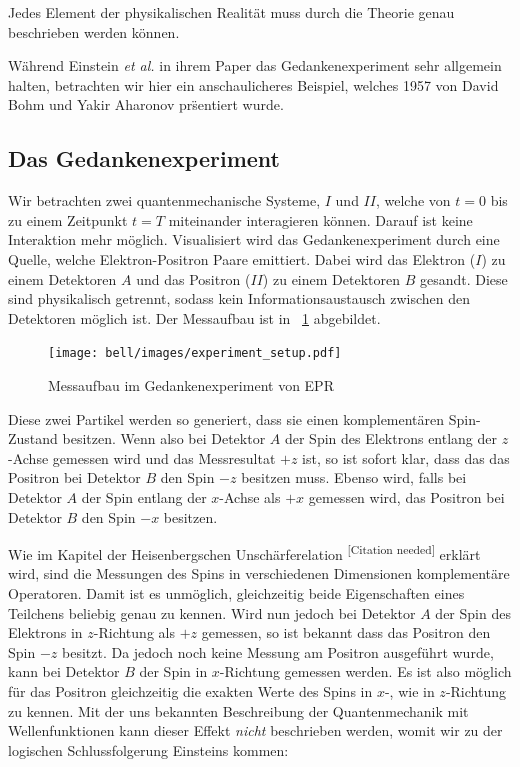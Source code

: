 \begin{refsection}
\begin{definition}\label{def:Bell:Vollstaendigkeit}
    Jedes Element der physikalischen Realit\"at muss durch die Theorie
    genau beschrieben werden k\"onnen.
\end{definition}

Während Einstein \emph{et al.} in ihrem Paper das Gedankenexperiment sehr
allgemein halten, betrachten wir hier ein anschaulicheres Beispiel, welches
1957 von David Bohm und Yakir Aharonov \cite{Bell:Bohm1957} pr\"sentiert wurde.

\subsection{Das Gedankenexperiment}
Wir betrachten zwei quantenmechanische Systeme, $I$ und $II$,
welche von $t=0$ bis zu einem Zeitpunkt $t=T$ miteinander 
interagieren k\"onnen. Darauf ist keine Interaktion mehr m\"oglich.
Visualisiert wird das Gedankenexperiment durch eine Quelle, welche
Elektron-Positron Paare emittiert. 
Dabei wird das Elektron ($I$) zu einem Detektoren $A$ und das 
Positron ($II$) zu einem Detektoren $B$ gesandt.
Diese sind physikalisch getrennt, sodass kein Informationsaustausch
zwischen den Detektoren m\"oglich ist.
Der Messaufbau ist in \figurename~\ref{fig:bell:EPR_Messaufbau} abgebildet.

\begin{figure}
    \centering
    \texttt{[image: bell/images/experiment\_setup.pdf]}
    \caption{Messaufbau im Gedankenexperiment von EPR}
    \label{fig:bell:EPR_Messaufbau}
\end{figure}

Diese zwei Partikel werden so generiert, dass sie einen komplement\"aren
Spin-Zustand besitzen. 
Wenn also bei Detektor $A$ der Spin des Elektrons entlang der $z$-Achse
gemessen wird und das Messresultat $+z$ ist, so ist sofort klar, dass
das das Positron bei Detektor $B$ den Spin $-z$ besitzen muss. 
Ebenso wird, falls bei Detektor $A$ der Spin entlang der $x$-Achse als $+x$
gemessen wird, das Positron bei Detektor $B$ den Spin $-x$ besitzen.

Wie im Kapitel der Heisenbergschen Unsch\"arferelation
\textsuperscript{[Citation needed]}
erkl\"art wird, sind die Messungen des Spins in verschiedenen Dimensionen 
komplement\"are Operatoren.
Damit ist es unm\"oglich, gleichzeitig beide Eigenschaften eines Teilchens
beliebig genau zu kennen.
Wird nun jedoch bei Detektor $A$ der Spin des Elektrons in $z$-Richtung 
als $+z$ gemessen, so ist bekannt dass das Positron den Spin $-z$ besitzt.
Da jedoch noch keine Messung am Positron ausgef\"uhrt wurde, kann bei
Detektor $B$ der Spin in $x$-Richtung gemessen werden.
Es ist also m\"oglich f\"ur das Positron gleichzeitig die exakten Werte 
des Spins in $x$-, wie in $z$-Richtung zu kennen. 
Mit der uns bekannten Beschreibung der Quantenmechanik mit Wellenfunktionen
kann dieser Effekt \emph{nicht} beschrieben werden, womit wir zu der
logischen Schlussfolgerung Einsteins kommen:


\end{refsection}
